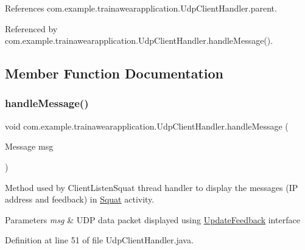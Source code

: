 References com.\+example.\+trainawearapplication.\+Udp\+Client\+Handler.\+parent.



Referenced by com.\+example.\+trainawearapplication.\+Udp\+Client\+Handler.\+handle\+Message().



\subsection{Member Function Documentation}
\mbox{\label{classcom_1_1example_1_1trainawearapplication_1_1_udp_client_handler_a433f624fad2243aaed2e97f7f3cb8434}} 
\subsubsection{\texorpdfstring{handleMessage()}{handleMessage()}}
{\footnotesize\ttfamily void com.\+example.\+trainawearapplication.\+Udp\+Client\+Handler.\+handle\+Message (\begin{DoxyParamCaption}\item[{Message}]{msg }\end{DoxyParamCaption})\hspace{0.3cm}{\ttfamily [inline]}}



Method used by Client\+Listen\+Squat thread handler to display the messages (IP address and feedback) in \mbox{\hyperlink{classcom_1_1example_1_1trainawearapplication_1_1_squat}{Squat}} activity. 


\begin{DoxyParams}{Parameters}
{\em msg} & U\+DP data packet displayed using \mbox{\hyperlink{interfacecom_1_1example_1_1trainawearapplication_1_1_update_feedback}{Update\+Feedback}} interface \\
\hline
\end{DoxyParams}


Definition at line 51 of file Udp\+Client\+Handler.\+java.


